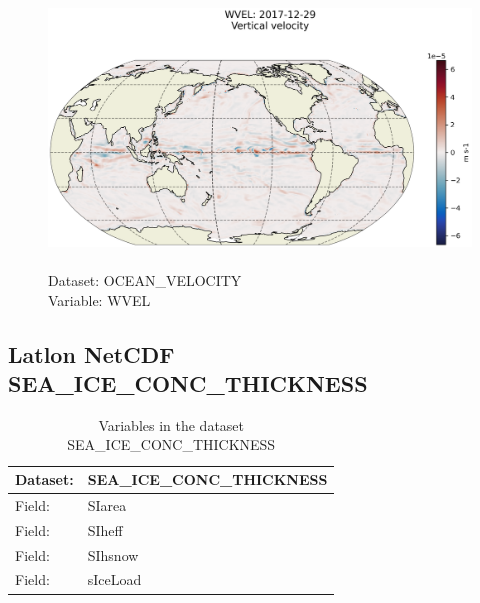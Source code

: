 \begin{figure}[H]
\centering
\includegraphics[scale=0.5]{../images/plots/latlon_plots/Ocean_Velocity/WVEL.png}
\caption{\\Dataset: OCEAN\_VELOCITY\\Variable: WVEL}
\label{tab:table-OCEAN_VELOCITY_WVEL-Plot}
\end{figure}
\pagebreak
\subsection{Latlon NetCDF SEA\_ICE\_CONC\_THICKNESS}
\newp
\begin{longtable}{|p{}|p{}|}
\caption{Variables in the dataset SEA\_ICE\_CONC\_THICKNESS}
\label{tab:table-SEA_ICE_CONC_THICKNESS-fields} \\ 
\hline \endhead \hline \endfoot
\rowcolor{lightgray} \textbf{Dataset:} & \textbf{SEA\_ICE\_CONC\_THICKNESS} \\ \hline
Field: &SIarea \\ \hline
Field: &SIheff \\ \hline
Field: &SIhsnow \\ \hline
Field: &sIceLoad \\ \hline
\end{longtable}

\pagebreak
